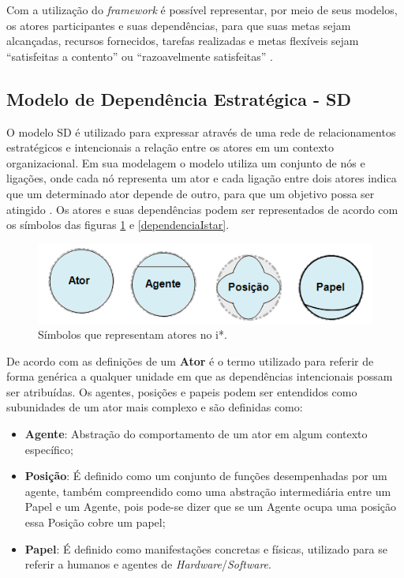 Com a utilização do \textit{framework} é possível representar, por meio de seus modelos, os atores participantes e suas dependências, para que suas metas sejam alcançadas, recursos fornecidos, tarefas realizadas e metas flexíveis sejam “satisfeitas a contento” ou “razoavelmente satisfeitas” \cite{istarwiki20}.
 
 
\subsection{Modelo de Dependência Estratégica - SD}
\label{subsec:SD}

O modelo SD é utilizado para expressar através de uma rede de relacionamentos estratégicos e intencionais a relação entre os atores em um contexto organizacional. Em sua modelagem o modelo utiliza um conjunto de nós e ligações, onde cada nó representa um ator e cada ligação entre dois atores indica que um determinado ator depende de outro, para que um objetivo possa ser atingido \cite{istarwiki20}. Os atores e suas dependências podem ser representados de acordo com os símbolos das figuras  \ref{atoresIstar} e \ref{dependenciaIstar}.

\begin{figure}[h!]
	\centering
	\includegraphics[keepaspectratio=true,scale=1.0]{figuras/papeisIstar.PNG}
	\caption{Símbolos que representam atores no i*.}
	\label{atoresIstar}
\end{figure}

De acordo com as definições de \cite{istarwiki20} um  \textbf{Ator} é o termo utilizado para referir de forma genérica a qualquer unidade em que as dependências intencionais possam ser atribuídas. Os agentes, posições e papeis podem ser entendidos como subunidades de um ator mais complexo e são definidas como: 

\begin{itemize}
	\item \textbf{Agente}: Abstração do comportamento de um ator em algum contexto específico; 
	\item \textbf{Posição}: É definido como um conjunto de funções desempenhadas por um agente, também compreendido como uma abstração intermediária entre um Papel e um Agente, pois pode-se dizer que se um Agente ocupa uma posição essa Posição cobre um papel;
	\item \textbf{Papel}: É definido como manifestações concretas e físicas, utilizado para se referir a humanos e agentes de \textit{Hardware}/\textit{Software}.
\end{itemize} 

